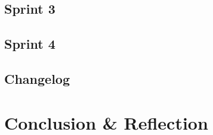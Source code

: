\documentclass[12pt]{report}
\begin{document}
	


	

	

	

	

	

	

	

	


	

	

	

	

	

	

	

	

\chapter{Sprint 3}

\chapter{Sprint 4}

\chapter{Changelog}

\part{Conclusion \& Reflection}
\end{document}
